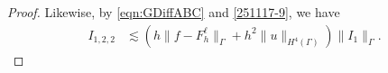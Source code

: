\documentclass[10pt, a4paper]{amsart}
\theoremstyle{definition}
\theoremstyle{remark}
\theoremstyle{example}
\numberwithin{equation}{section}
\newcommand{\tbar}[1]{{\left\vert\kern-0.25ex\left\vert\kern-0.25ex\left\vert #1 
    \right\vert\kern-0.25ex\right\vert\kern-0.25ex\right\vert}}
\begin{document}
\begin{proof}
Likewise, by \eqref{eqn:GDiffABC} and \eqref{251117-9}, we have
\begin{align}
I_{1,2,2}
& \lesssim (h\|f - F_h^\ell\|_{\Gamma} + h^2\|u\|_{H^4(\Gamma)})\|I_1\|_\Gamma. \label{251117-17}
\end{align}

\end{proof}
\end{document}

